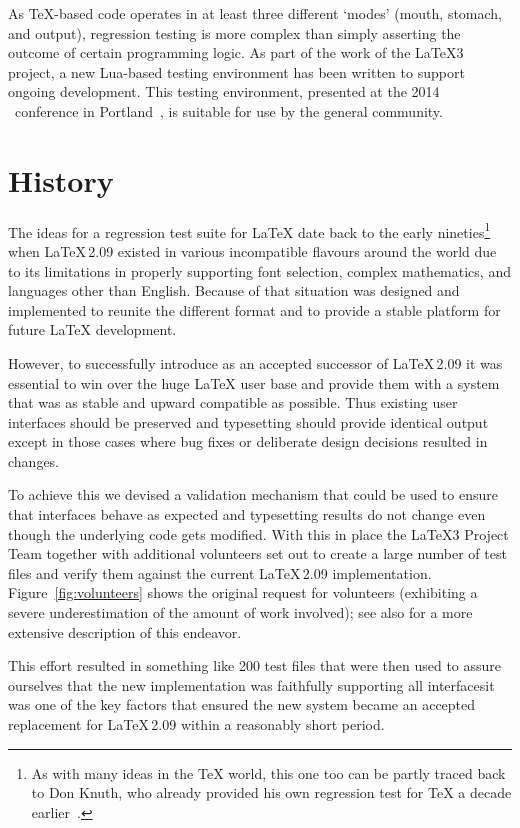 \documentclass[final]{ltugboat}
\begin{document}
As \TeX{}-based code operates in at least three different `modes'
(mouth, stomach, and output), regression testing is more complex than
simply asserting the outcome of certain programming logic.  As part of
the work of the \LaTeX3 project, a new Lua-based testing environment
has been written to support ongoing development.  This testing
environment, presented at the 2014 \tug\ conference in
Portland~\cite{Mittelbach:l3buildtalk}, is suitable for use by the
general community.


\section{History}

The ideas for a regression test suite for \LaTeX{} date back to the
early nineties\footnote{As with many ideas in the \TeX{} world, this one too
  can be partly traced back to Don Knuth, who already provided his own
  regression test for \TeX{} a decade
  earlier~\cite{Knuth:1984:TTT}.} when \LaTeX\,2.09 existed in various
incompatible flavours around the world due to its limitations in
properly supporting font selection, complex mathematics, and languages
other than English.  Because of that situation \LaTeXe{} was designed
and implemented to reunite the different format and to provide a
stable platform for future \LaTeX{} development.

However, to successfully introduce \LaTeXe{} as an accepted successor
of \LaTeX\,2.09 it was essential to win over the huge \LaTeX{} user
base and provide them with a system that was as stable and upward
compatible as possible. Thus existing user interfaces should be
preserved and typesetting should provide identical output except in
those cases where bug fixes or deliberate design decisions resulted in
changes.

To achieve this we devised a validation mechanism that could be used
to ensure that interfaces behave as expected and typesetting results
do not change even though the underlying code gets modified. With
this in place the \LaTeX3 Project Team together with additional
volunteers set out to create a large number of test files and
verify them against the current \LaTeX\,2.09
implementation. Figure~\ref{fig:volunteers} shows the original request
for volunteers (exhibiting a severe underestimation of the amount of
work involved); see also \cite{Mittelbach:TB18-4-309} for a more extensive
description of this endeavor. 

This effort resulted in something like 200 test files
that were then used to assure ourselves that the new \LaTeXe{}
implementation was faithfully supporting all interfaces\Dash it was one
of the key factors that ensured the new system became an accepted replacement
for \LaTeX\,2.09 within a reasonably short period.
\end{document}
